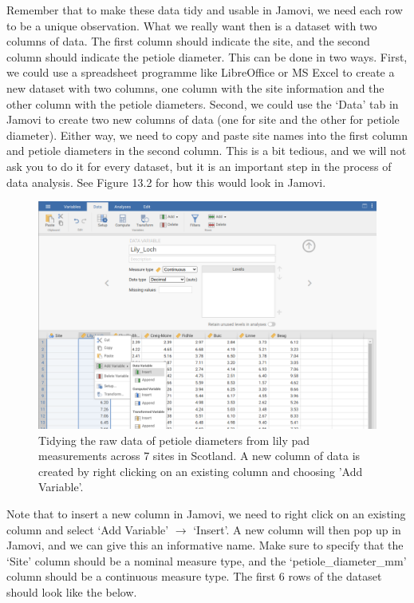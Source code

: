 \documentclass[
]{scrbook}
\begin{document}
Remember that to make these data tidy and usable in Jamovi, we need each row to be a unique observation.
What we really want then is a dataset with two columns of data.
The first column should indicate the site, and the second column should indicate the petiole diameter.
This can be done in two ways.
First, we could use a spreadsheet programme like LibreOffice or MS Excel to create a new dataset with two columns, one column with the site information and the other column with the petiole diameters.
Second, we could use the `Data' tab in Jamovi to create two new columns of data (one for site and the other for petiole diameter).
Either way, we need to copy and paste site names into the first column and petiole diameters in the second column.
This is a bit tedious, and we will not ask you to do it for every dataset, but it is an important step in the process of data analysis.
See Figure 13.2 for how this would look in Jamovi.

\begin{figure}
\includegraphics[width=1\linewidth]{img/lilypad_tidy} \caption{Tidying the raw data of petiole diameters from lily pad measurements across 7 sites in Scotland. A new column of data is created by right clicking on an existing column and choosing 'Add Variable'.}\label{fig:unnamed-chunk-45}
\end{figure}

Note that to insert a new column in Jamovi, we need to right click on an existing column and select `Add Variable' \(\to\) `Insert'.
A new column will then pop up in Jamovi, and we can give this an informative name.
Make sure to specify that the `Site' column should be a nominal measure type, and the `petiole\_diameter\_mm' column should be a continuous measure type.
The first 6 rows of the dataset should look like the below.
\end{document}
